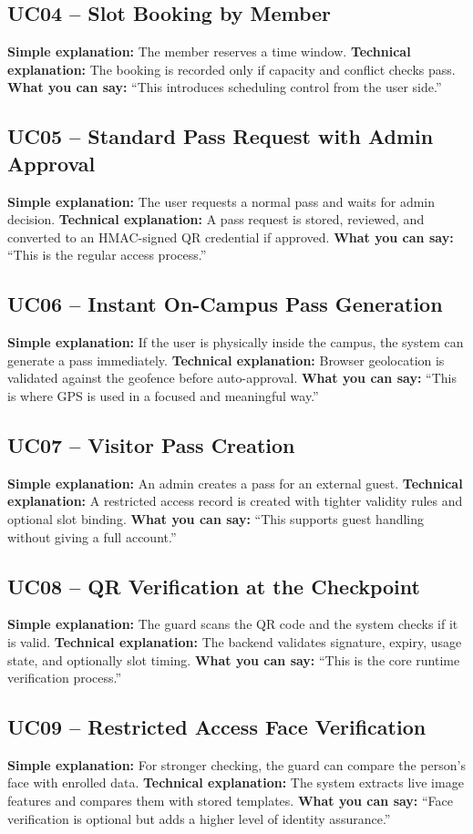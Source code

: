 \documentclass[12pt,letterpaper]{article}
\newcommand{\simple}[1]{\textbf{Simple explanation:} #1}
\newcommand{\technical}[1]{\textbf{Technical explanation:} #1}
\newcommand{\say}[1]{\textbf{What you can say:} ``#1''}
\begin{document}
\subsection{UC04 -- Slot Booking by Member}
\simple{The member reserves a time window.}
\technical{The booking is recorded only if capacity and conflict checks pass.}
\say{This introduces scheduling control from the user side.}

\subsection{UC05 -- Standard Pass Request with Admin Approval}
\simple{The user requests a normal pass and waits for admin decision.}
\technical{A pass request is stored, reviewed, and converted to an HMAC-signed QR credential if approved.}
\say{This is the regular access process.}

\subsection{UC06 -- Instant On-Campus Pass Generation}
\simple{If the user is physically inside the campus, the system can generate a pass immediately.}
\technical{Browser geolocation is validated against the geofence before auto-approval.}
\say{This is where GPS is used in a focused and meaningful way.}

\subsection{UC07 -- Visitor Pass Creation}
\simple{An admin creates a pass for an external guest.}
\technical{A restricted access record is created with tighter validity rules and optional slot binding.}
\say{This supports guest handling without giving a full account.}

\subsection{UC08 -- QR Verification at the Checkpoint}
\simple{The guard scans the QR code and the system checks if it is valid.}
\technical{The backend validates signature, expiry, usage state, and optionally slot timing.}
\say{This is the core runtime verification process.}

\subsection{UC09 -- Restricted Access Face Verification}
\simple{For stronger checking, the guard can compare the person’s face with enrolled data.}
\technical{The system extracts live image features and compares them with stored templates.}
\say{Face verification is optional but adds a higher level of identity assurance.}
\end{document}
